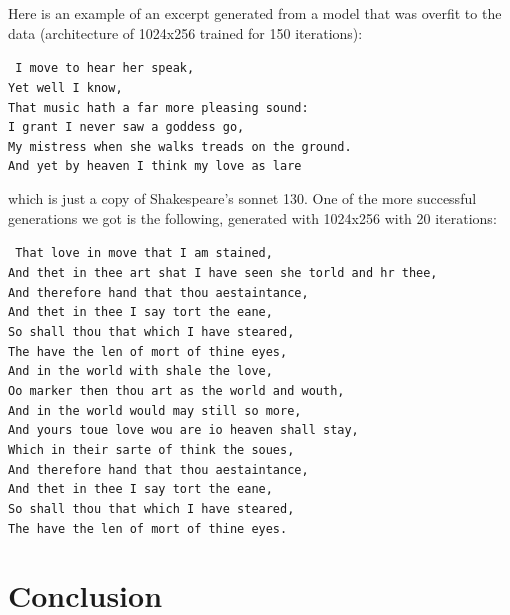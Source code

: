 \indent Here is an example of an excerpt generated from a model that was overfit to the data (architecture of 1024x256 trained for 150 iterations): \\
\begin{small}
\texttt{
    I move to hear her speak, \\
    Yet well I know, \\
    That music hath a far more pleasing sound: \\
    I grant I never saw a goddess go, \\
    My mistress when she walks treads on the ground. \\
    And yet by heaven I think my love as lare \\
} 
\end{small}
which is just a copy of Shakespeare's sonnet 130. One of the more successful generations we got is the following, generated with 1024x256 with 20 iterations: \\
\begin{small}
\texttt{
    That love in move that I am stained, \\
    And thet in thee art shat I have seen she torld and hr thee, \\
    And therefore hand that thou aestaintance, \\
    And thet in thee I say tort the eane, \\
    So shall thou that which I have steared, \\
    The have the len of mort of thine eyes, \\
    And in the world with shale the love, \\
    Oo marker then thou art as the world and wouth, \\
    And in the world would may still so more, \\
    And yours toue love wou are io heaven shall stay, \\
    Which in their sarte of think the soues, \\
    And therefore hand that thou aestaintance, \\
    And thet in thee I say tort the eane, \\
    So shall thou that which I have steared, \\
    The have the len of mort of thine eyes. \\
}
\end{small}


\section{Conclusion}
\medskip

